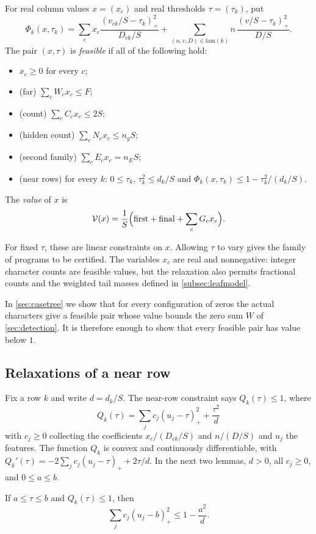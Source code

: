 \begin{definition}\label{def:leafprogram}
For real column values $x=(x_c)$ and real thresholds $\tau=(\tau_k)$, put
\[
  \Phi_k(x,\tau_k)=\sum_c x_c\frac{(v_{ck}/S-\tau_k)_+^2}{D_{ck}/S}
  +\sum_{(n,v,D)\in\mathrm{fam}(k)} n\,\frac{(v/S-\tau_k)_+^2}{D/S}.
\]
The pair $(x,\tau)$ is \emph{feasible} if all of the following hold:
\begin{itemize}
  \item $x_c\ge0$ for every $c$;
  \item (far) $\sum_cW_cx_c\le F$;
  \item (count) $\sum_cC_cx_c\le2S$;
  \item (hidden count) $\sum_cN_cx_c\le n_gS$;
  \item (second family) $\sum_cE_cx_c=n_ES$;
  \item (near rows) for every $k$: $0\le\tau_k$, $\tau_k^2\le d_k/S$ and
    $\Phi_k(x,\tau_k)\le1-\tau_k^2/(d_k/S)$.
\end{itemize}
The \emph{value} of $x$ is
\[
  \mathcal{V}(x)=\frac1S\Bigl(\mathrm{first}+\mathrm{final}+\sum_cG_cx_c\Bigr).
\]
\end{definition}

For fixed $\tau$, these are linear constraints on $x$. Allowing $\tau$ to vary gives
the family of programs to be certified. The variables $x_c$ are real and nonnegative:
integer character counts are feasible values, but the relaxation also permits
fractional counts and the weighted tail masses defined in \cref{subsec:leafmodel}.

In \cref{sec:casetree} we show that for every configuration of zeros the actual characters give a
feasible pair whose value bounds the zero sum $W$ of \cref{sec:detection}. It is therefore enough
to show that every feasible pair has value below $1$.

\subsection{Relaxations of a near row}
Fix a row $k$ and write $d=d_k/S$. The near-row constraint says
$Q_k(\tau)\le1$, where
\[
  Q_k(\tau)=\sum_jc_j(u_j-\tau)_+^2+\frac{\tau^2}{d}
\]
with $c_j\ge0$ collecting the coefficients $x_c/(D_{ck}/S)$ and $n/(D/S)$ and $u_j$ the features.
The function $Q_k$ is convex and continuously differentiable, with
$Q_k'(\tau)=-2\sum_jc_j(u_j-\tau)_++2\tau/d$. In the next two lemmas, $d>0$, all
$c_j\ge0$, and $0\le a\le b$.

\begin{lemma}\label{lem:firstorder}
If $a\le\tau\le b$ and $Q_k(\tau)\le1$, then
\[
  \sum_jc_j(u_j-b)_+^2\le1-\frac{a^2}{d}.
\]
\end{lemma}

